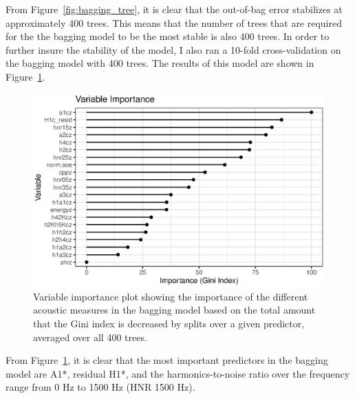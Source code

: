 From Figure~\ref{fig:bagging_tree}, it is clear that the out-of-bag error stabilizes at approximately 400 trees. This means that the number of trees that are required for the the bagging model to be the most stable is also 400 trees. In order to further insure the stability of the model, I also ran a 10-fold cross-validation on the bagging model with 400 trees. The results of this model are shown in Figure~\ref{fig:bagging_importance}.

\begin{figure}[!h]
    \centering
    \includegraphics[width = 0.9\linewidth]{images/vip_bagging.eps}
    \caption{Variable importance plot showing the importance of the different acoustic measures in the bagging model based on the total amount that the Gini index is decreased by splits over a given predictor, averaged over all 400 trees.}
    \label{fig:bagging_importance}
\end{figure}

From Figure~\ref{fig:bagging_importance}, it is clear that the most important predictors in the bagging model are A1*, residual H1*, and the harmonics-to-noise ratio over the frequency range from 0 Hz to 1500 Hz (HNR 1500 Hz). 



